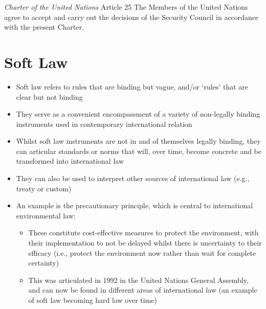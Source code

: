 \begin{conventiondetails}{\textit{Charter of the United Nations} Article 25}\label{UN Charter Art 25}
    \flushleft
    The Members of the United Nations agree to accept and carry out the decisions of the Security Council in accordance with the present Charter.
\end{conventiondetails}

\section{Soft Law}
\begin{itemize}
    \item Soft law refers to rules that are binding but vague, and/or `rules' that are clear but not binding
    \item They serve as a convenient encompassment of a variety of non-legally binding instruments used in contemporary international relation
    \item Whilst soft law instruments are not in and of themselves legally binding, they can articular standards or norms that will, over time, become concrete and be transformed into international law
    \item They can also be used to interpret other sources of international law (e.g., treaty or custom)
    \item An example is the precautionary principle, which is central to international environmental law:
    \begin{itemize}
        \item These constitute cost-effective measures to protect the environment, with their implementation to not be delayed whilst there is uncertainty to their efficacy (i.e., protect the environment now rather than wait for complete certainty)
        \item This was articulated in 1992 in the United Nations General Assembly, and can now be found in different areas of international law (an example of soft law becoming hard law over time)
    \end{itemize}
\end{itemize}
